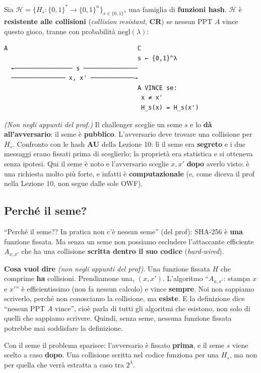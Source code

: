 Sia \(\mathcal{H} = \{H_s : \{0,1\}^* \to \{0,1\}^n\}_{s \in \{0,1\}^\lambda}\) una famiglia di \textbf{funzioni hash}. \(\mathcal{H}\) è \textbf{resistente alle collisioni} (\emph{collision resistant}, \textbf{CR}) se nessun PPT \(A\) vince questo gioco, tranne con probabilità \(\text{negl}(\lambda)\):

\begin{verbatim}
A                                    C
                                     s ← {0,1}^λ
  ←──────────────── s ───────────────
  ─────────────── x, x' ────────────→
                                     A VINCE se:
                                      x ≠ x'
                                      H_s(x) = H_s(x')
\end{verbatim}

\begin{nota}
\emph{(Non negli appunti del prof.)} Il challenger sceglie un seme \(s\) e lo \textbf{dà all'avversario}: il seme è \textbf{pubblico}. L'avversario deve trovare una collisione per \(H_s\). Confronto con le hash \textbf{AU} della Lezione 10: lì il seme era \textbf{segreto} e i due messaggi erano fissati prima di sceglierlo; la proprietà era statistica e si otteneva senza ipotesi. Qui il seme è noto e l'avversario sceglie \(x, x'\) \textbf{dopo} averlo visto: è una richiesta molto più forte, e infatti è \textbf{computazionale} (e, come diceva il prof nella Lezione 10, non segue dalle sole OWF).
\end{nota}

\subsection{Perché il seme?}

``Perché il seme?? In pratica non c'è nessun seme'' (del prof): SHA-256 è \textbf{una} funzione fissata. Ma senza un seme non possiamo escludere l'attaccante efficiente \(A_{x, x'}\) che ha una collisione \textbf{scritta dentro il suo codice} (\emph{hard-wired}).

\begin{nota}
\textbf{Cosa vuol dire} \emph{(non negli appunti del prof)}. Una funzione fissata \(H\) che comprime \textbf{ha} collisioni. Prendiamone una, \((x, x')\). L'algoritmo ``\(A_{x, x'}\): stampa \(x\) e \(x'\)'' è efficientissimo (non fa nessun calcolo) e vince \textbf{sempre}. Noi non sappiamo scriverlo, perché non conosciamo la collisione, ma \textbf{esiste}. E la definizione dice ``nessun PPT \(A\) vince'', cioè parla di tutti gli algoritmi che esistono, non solo di quelli che sappiamo scrivere. Quindi, senza seme, nessuna funzione fissata potrebbe mai soddisfare la definizione.

Con il seme il problema sparisce: l'avversario è fissato \textbf{prima}, e il seme \(s\) viene scelto a caso \textbf{dopo}. Una collisione scritta nel codice funziona per una \(H_s\), ma non per quella che verrà estratta a caso tra \(2^\lambda\).
\end{nota}

